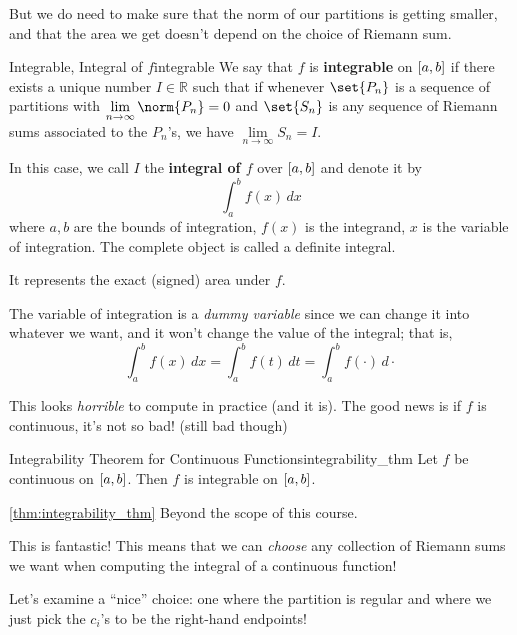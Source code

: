 But we do need to make sure that the norm of our partitions is getting smaller,
and that the area we get doesn't depend on the choice of Riemann sum.

\begin{Definition}{Integrable, Integral of $ f $}{integrable}
    We say that $ f $ is \textbf{integrable} on $ \interval{a}{b} $ if there exists a unique number
    $ I\in\mathbb{R} $ such that if whenever $ \set{P_n} $ is a sequence of partitions with
    $ \lim\limits_{{n} \to {\infty}}\norm{P_n}=0 $ and $ \set{S_n} $ is any sequence of
    Riemann sums associated to the $ P_n $'s, we have $ \lim\limits_{{n} \to {\infty}} S_n=I $.

    In this case, we call $ I $ the \textbf{integral of $ f $} over $ \interval{a}{b} $
    and denote it by
    \[ \int_{a}^{b} f(x)\, dx \]
    where $ a,b $ are the bounds of integration, $ f(x) $ is the integrand, $ x $ is the
    variable of integration. The complete object is called a definite integral.

    It represents the exact (signed) area under $ f $.
\end{Definition}

\begin{Remark}{}{}
    The variable of integration is a \emph{dummy variable} since we can change it into
    whatever we want, and it won't change the value of the integral; that is,
    \[
        \int_{a}^{b} f(x)\,dx =
        \int_{a}^{b} f(t) \,d{t}=
        \int_{a}^{b} f(\cdot)\, d{\cdot}
    \]
\end{Remark}

This looks \emph{horrible} to compute in practice (and it is). The good news is if
$ f $ is continuous, it's not so bad! (still bad though)

\begin{Theorem}{Integrability Theorem for Continuous Functions}{integrability_thm}
    Let $ f $ be continuous on $ \interval{a}{b} $.
    Then $ f $ is integrable on $ \interval{a}{b} $.
\end{Theorem}

\begin{Proof}{\ref{thm:integrability_thm}}{}
    Beyond the scope of this course.
\end{Proof}

This is fantastic! This means that we can \emph{choose} any collection of Riemann sums
we want when computing the integral of a continuous function!

Let's examine a ``nice'' choice: one where the partition is regular and where we just
pick the $ c_i $'s to be the right-hand endpoints!

